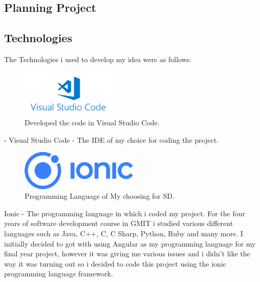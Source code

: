 \subsection{Planning Project}

\subsection{Technologies}
The Technologies i used to develop my idea were as follows:
\newline

\begin{figure}[h!]
	\caption{Developed the code in Visual Studio Code.}
	\label{image:vscode}
	\centering
	\includegraphics[width=0.4\textwidth]{images/vscode.png}
\end{figure}

- Visual Studio Code - The IDE of my choice for coding the project.
\newline

\begin{figure}[h!]
	\caption{Programming Language of My choosing for SD.}
	\label{image:ionic}
	\centering
	\includegraphics[width=0.5\textwidth]{images/ionic.png}
\end{figure}
Ionic - The programming language in which i coded my project. For  the four years of software development course in GMIT i studied various different languages such as Java, C++, C, C Sharp, Python, Ruby and many more. I initially decided to got with using Angular as my programming language for my final year project, however it was giving me various issues and i didn't like the way it was turning out so i decided to code this project using the ionic programming language framework.
\newline

